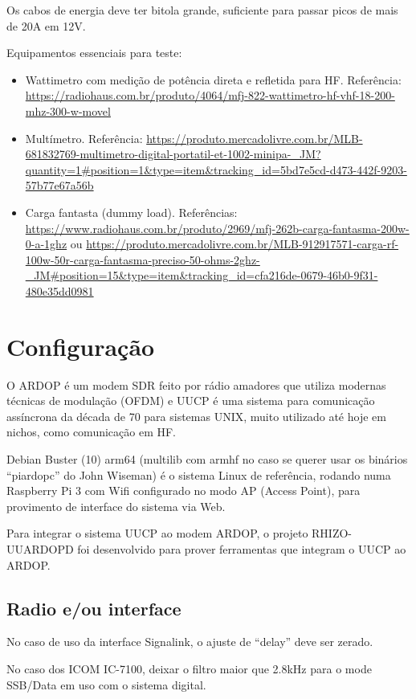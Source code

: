 \documentclass[11pt,a4paper]{article}
\begin{document}
Os cabos de energia deve ter bitola grande, suficiente para passar picos de mais de 20A em 12V.

Equipamentos essenciais para teste:
\begin{itemize}
\item Wattimetro com medição de potência direta e refletida para HF. Referência: \url{https://radiohaus.com.br/produto/4064/mfj-822-wattimetro-hf-vhf-18-200-mhz-300-w-movel}
\item Multímetro. Referência: \url{https://produto.mercadolivre.com.br/MLB-681832769-multimetro-digital-portatil-et-1002-minipa-_JM?quantity=1#position=1&type=item&tracking_id=5bd7e5cd-d473-442f-9203-57b77e67a56b}
\item Carga fantasta (dummy load). Referências: \url{https://www.radiohaus.com.br/produto/2969/mfj-262b-carga-fantasma-200w-0-a-1ghz} ou \url{https://produto.mercadolivre.com.br/MLB-912917571-carga-rf-100w-50r-carga-fantasma-preciso-50-ohms-2ghz-_JM#position=15&type=item&tracking_id=cfa216de-0679-46b0-9f31-480e35dd0981}
\end{itemize}


\section{Configuração}

O ARDOP é um modem SDR feito por rádio amadores que utiliza modernas
técnicas de modulação (OFDM) e UUCP é uma sistema para comunicação
assíncrona da década de 70 para sistemas UNIX, muito utilizado até
hoje em nichos, como comunicação em HF.

Debian Buster (10) arm64 (multilib com armhf no caso se querer usar os
binários ``piardopc'' do John Wiseman) é o sistema Linux de referência,
rodando numa Raspberry Pi 3 com Wifi configurado no modo AP (Access Point),
para provimento de interface do sistema via Web.

Para integrar o sistema UUCP ao modem ARDOP, o projeto RHIZO-UUARDOPD
foi desenvolvido para prover ferramentas que integram o UUCP ao ARDOP.

\subsection{Radio e/ou interface}

No caso de uso da interface Signalink, o ajuste de ``delay'' deve ser
zerado.

No caso dos ICOM IC-7100, deixar o filtro maior que 2.8kHz para o mode
SSB/Data em uso com o sistema digital.
\end{document}
